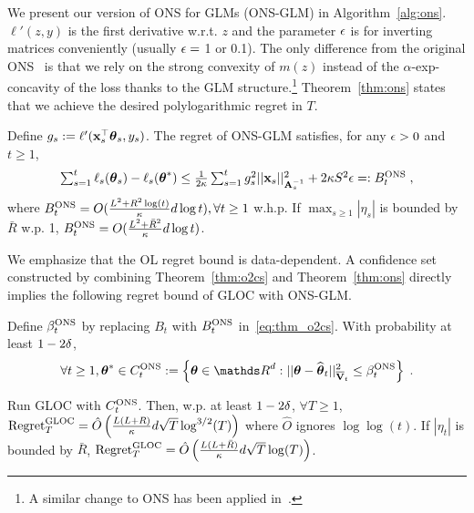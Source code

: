 We present our version of ONS for GLMs (ONS-GLM) in Algorithm~\ref{alg:ons}.
$\ell'(z,y)$ is the first derivative w.r.t. $z$ and the parameter $\epsilon$ is for inverting matrices conveniently (usually $\epsilon = $ 1 or 0.1).
The only difference from the original ONS~\cite{hazan07logarithmic} is that we rely on the strong convexity of $m(z)$ instead of the $\alpha$-exp-concavity of the loss thanks to the GLM structure.\footnote{ A similar change to ONS has been applied in~\cite{gentile14onmultilabel,zhang16online}.}
Theorem~\ref{thm:ons} states that we achieve the desired polylogarithmic regret in $T$.
%
\begin{thm}\label{thm:ons}
  Define $g_s := \ell'(\mathbf{x}_s^{\top}{{\boldsymbol \theta}}_s, y_s)$.
  The regret of ONS-GLM satisfies, for any $\epsilon > 0$ and $t\ge 1$,
  \[
    \textstyle \sum_{s=1}^t \ell_s( {{\boldsymbol \theta}}_s) - \ell_s({{\boldsymbol \theta}}^*) \le { \frac{1}{2{\ensuremath{\kappa}}} } \sum_{s=1}^t g_s^2 ||\mathbf{x}_s||^2_{\mathbf{A}_s^{-1}} + 2{\kappa} S^2 \epsilon =: B^{\emph{{\ensuremath{\text{\normalfont ONS}}}}}_t \;,
  \]
  where $B^{\text{\normalfont ONS}}_t = O({ \frac{L^2+ R^2\log(t)}{{\kappa}} }d\log t), \forall t\ge1$ w.h.p. If $\max_{s\ge1} |\eta_s|$ is bounded by $\bar R$ w.p. 1, $B^{\text{\normalfont ONS}}_t = O({ \frac{L^2+\bar R^2}{{\kappa}} }d\log t)$.
\end{thm}
We emphasize that the OL regret bound is data-dependent. %
%
A confidence set constructed by combining Theorem~\ref{thm:o2cs} and Theorem~\ref{thm:ons} directly implies the following regret bound of GLOC with ONS-GLM.
\begin{cor} \label{cor:cset_ONS}
  Define $\beta_t^{\emph{{\ensuremath{\text{\normalfont ONS}}}}}$ by replacing $B_t$ with $B^{\emph{{\ensuremath{\text{\normalfont ONS}}}}}_t$ in~\eqref{eq:thm_o2cs}.
  With probability at least $1-2{\delta}$, 
  \begin{equation}\begin{aligned} \label{eq:cset_ONS}
      \forall t\ge1, \th^* \in C^{\emph\ONS}_t := \lt\{\th\in\dsR^d : || \th - \hth_t ||^2_{\barV_t} \le \beta^{\emph\ONS}_t \rt\} \;.
  \end{aligned}\end{equation}                                                                                 
\end{cor}
\begin{cor} \label{cor:regret_glocon_ons}
  Run GLOC with $C^{{\text{\normalfont ONS}}}_t$. Then, w.p. at least $1-2{\delta}$, $\forall T\ge1$,
  $\normalfont{\text{Regret}}_T^{{\text{\normalfont GLOC}}} = \hat O\left({ \frac{L(L+R)}{{\kappa}} } d \sqrt{T} \log^{3/2}(T)\right) $ where $\hat{O}$ ignores $\log\log(t)$.
  If $|\eta_t|$ is bounded by $\bar R$, $\normalfont{\text{Regret}}_T^{{\text{\normalfont GLOC}}} = \hat O\left({ \frac{L(L + \bar R)}{{\kappa}} } d \sqrt{T} \log(T)\right)$.
\end{cor}


